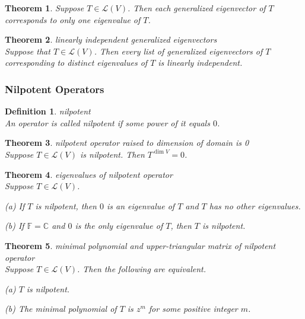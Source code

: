 \documentclass{article}
\newtheorem{theorem}{Theorem}[subsection]
\newtheorem{definition}{Definition}[subsection]
\newcommand{\CC}{\mathbb{C}}
\newcommand{\FF}{\mathbb{F}}
\begin{document}
\begin{CJK}{UTF8}{gkai}
\begin{theorem}
    Suppose $T \in \mathcal{L}(V)$. Then each generalized eigenvector of $T$ corresponds to only one eigenvalue of $T$.
\end{theorem}

\begin{theorem}
    linearly independent generalized eigenvectors\\

    Suppose that $T \in \mathcal{L}(V)$. Then every list of generalized eigenvectors of $T$ corresponding to distinct eigenvalues of $T$ is linearly independent.
\end{theorem}

\subsubsection{Nilpotent Operators}

\begin{definition}
    nilpotent\\

    An operator is called nilpotent if some power of it equals $0$.
\end{definition}

\begin{theorem}
    nilpotent operator raised to dimension of domain is 0\\

    Suppose $T \in \mathcal{L}(V)$ is nilpotent. Then $T^{\dim V} = 0$.
\end{theorem}

\begin{theorem}
    eigenvalues of nilpotent operator\\
    
    Suppose $T \in \mathcal{L}(V)$.

    (a) If $T$ is nilpotent, then $0$ is an eigenvalue of $T$ and $T$ has no other eigenvalues.

    (b) If $\FF = \CC$ and $0$ is the only eigenvalue of $T$, then $T$ is nilpotent.
\end{theorem}

\begin{theorem}
    minimal polynomial and upper-triangular matrix of nilpotent operator\\

    Suppose $T \in \mathcal{L}(V)$. Then the following are equivalent.

    (a) $T$ is nilpotent.

    (b) The minimal polynomial of $T$ is $z^m$ for some positive integer $m$.


\end{theorem}
\end{CJK}
\end{document}
